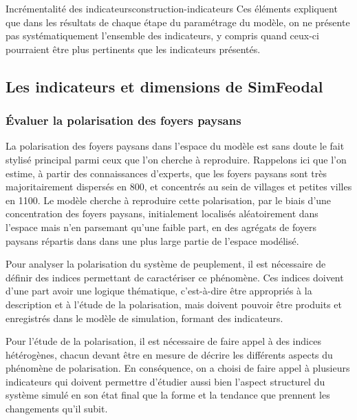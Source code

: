 \begin{encadre}{Incrémentalité des indicateurs}{construction-indicateurs}
	Ces éléments expliquent que dans les résultats de chaque étape du paramétrage du modèle, on ne présente pas systématiquement l'ensemble des indicateurs, y compris quand ceux-ci pourraient être plus pertinents que les indicateurs présentés.
\end{encadre}


\pagebreak

\subsection{Les indicateurs et dimensions de SimFeodal}

\subsubsection{Évaluer la polarisation des foyers paysans \label{subsub:polarisation}}

La polarisation des foyers paysans dans l'espace du modèle est sans doute le fait stylisé principal parmi ceux que l'on cherche à reproduire. Rappelons ici que l'on estime, à partir des connaissances d'experts, que les foyers paysans sont très majoritairement dispersés en 800, et concentrés au sein de villages et petites villes en 1100.
Le modèle cherche à reproduire cette polarisation, par le biais d'une concentration des foyers paysans, initialement localisés aléatoirement dans l'espace mais n'en parsemant qu'une faible part, en des agrégats de foyers paysans répartis dans dans une plus large partie de l'espace modélisé.

Pour analyser la polarisation du système de peuplement, il est nécessaire de définir des indices permettant de caractériser ce phénomène. Ces indices doivent d'une part avoir une logique thématique, c'est-à-dire être appropriés à la description et à l'étude de la polarisation, mais doivent  pouvoir être produits et enregistrés dans le modèle de simulation, formant des indicateurs.

Pour l'étude de la polarisation, il est nécessaire de faire appel à des indices hétérogènes, chacun devant être en mesure de décrire les différents aspects du phénomène de polarisation. En conséquence, on a choisi de faire appel à plusieurs indicateurs qui doivent permettre d'étudier aussi bien l'aspect structurel du système simulé en son état final que la forme et la tendance que prennent les changements qu'il subit.

